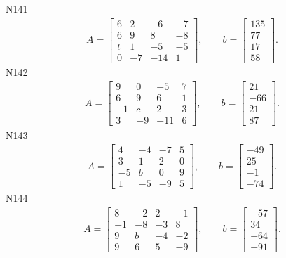 \documentclass[11pt]{report}
\begin{document}
N141
\begin{align*}
 A = \left[\begin{matrix}6 & 2 & -6 & -7\\6 & 9 & 8 & -8\\t & 1 & -5 & -5\\0 & -7 & -14 & 1\end{matrix}\right],
\qquad b = \left[\begin{matrix}135\\77\\17\\58\end{matrix}\right]. 
 \end{align*}
N142
\begin{align*}
 A = \left[\begin{matrix}9 & 0 & -5 & 7\\6 & 9 & 6 & 1\\-1 & c & 2 & 3\\3 & -9 & -11 & 6\end{matrix}\right],
\qquad b = \left[\begin{matrix}21\\-66\\21\\87\end{matrix}\right]. 
 \end{align*}
N143
\begin{align*}
 A = \left[\begin{matrix}4 & -4 & -7 & 5\\3 & 1 & 2 & 0\\-5 & b & 0 & 9\\1 & -5 & -9 & 5\end{matrix}\right],
\qquad b = \left[\begin{matrix}-49\\25\\-1\\-74\end{matrix}\right]. 
 \end{align*}
N144
\begin{align*}
 A = \left[\begin{matrix}8 & -2 & 2 & -1\\-1 & -8 & -3 & 8\\9 & b & -4 & -2\\9 & 6 & 5 & -9\end{matrix}\right],
\qquad b = \left[\begin{matrix}-57\\34\\-64\\-91\end{matrix}\right]. 
 \end{align*}
\end{document}
